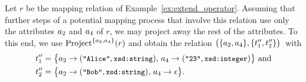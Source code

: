 \begin{example}
	\label{ex:projection_operator}
		Let $r$ be the mapping relation of Example~\ref{ex:extend_operator}. Assuming that further steps of a potential mapping process that involve this relation use only the attributes $a_2$ and $a_4$ of $r$, we may project away the rest of the attributes. To this end, we use $\text{Project}^{\{a_2, a_4\}}(r)$ and obtain
	the
	relation $\big(\{ a_2, a_4\}, \{t_1'',t_2''\}\big)$~with 
%
\vspace{-2mm} %
%
	\begin{align*}
        t_1'' &= \big\{ a_2 \rightarrow (\texttt{\small "Alice"}, \texttt{\small xsd:string}), \, a_4 \rightarrow (\texttt{\small "23"}, \texttt{\small xsd:integer}) \big\}
        \text{ and}
        \\
        t_2'' &= \big\{ a_2 \rightarrow (\texttt{\small "Bob"}, \texttt{\small xsd:string}), \, a_4 \rightarrow \epsilon \big\}
        .
	\end{align*}
\end{example}


%
%


